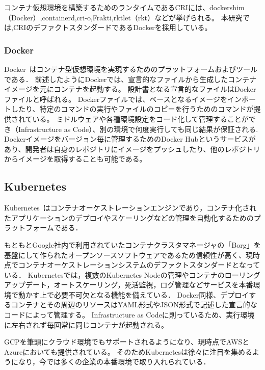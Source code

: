 コンテナ仮想環境を構築するためのランタイムであるCRIには、dockershim（Docker）,containerd,cri-o,Frakti,rktlet（rkt）などが挙げられる。
本研究では,CRIのデファクトスタンダードであるDockerを採用している。

\subsubsection{Docker}
\label{background:container-orchestration-system:container:docker}

Docker~\cite{Docker}はコンテナ型仮想環境を実現するためのプラットフォームおよびツールである．
前述したようにDockerでは、宣言的なファイルから生成したコンテナイメージを元にコンテナを起動する。
設計書となる宣言的なファイルはDockerファイルと呼ばれる。
Dockerファイルでは、ベースとなるイメージをインポートしたり、特定のコマンドの実行やファイルのコピーを行うためのコマンドが提供されている。
ミドルウェアや各種環境設定をコード化して管理することができ（Infrastructure as Code）、別の環境で何度実行しても同じ結果が保証される.
Dockerイメージをバージョン毎に管理するためのDocker Hubというサービスがあり、開発者は自身のレポジトリにイメージをプッシュしたり、他のレポジトリからイメージを取得することも可能である。

\subsection{Kubernetes}
\label{background:container-orchestration-system:kubernetes}

Kubernetes~\cite{Kubernetes}はコンテナオーケストレーションエンジンであり，コンテナ化されたアプリケーションのデプロイやスケーリングなどの管理を自動化するためのプラットフォームである．

もともとGoogle社内で利用されていたコンテナクラスタマネージャの「Borg」を基盤にして作られたオープンソースソフトウェアであるため信頼性が高く、現時点でコンテナオーケストレーションシステムのデファクトスタンダードとなっている．
Kubernetesでは，複数のKubernetes Nodeの管理やコンテナのローリングアップデート，オートスケーリング，死活監視，ログ管理などサービスを本番環境で動かす上で必要不可欠となる機能を備えている．
Docker同様、デプロイするコンテナとその周辺のリソースはYAML形式やJSON形式で記述した宣言的なコードによって管理する。
Infrastructure as Codeに則っているため、実行環境に左右されず毎回常に同じコンテナが起動される。

GCPを筆頭にクラウド環境でもサポートされるようになり、現時点でAWSとAzureにおいても提供されている。
そのためKubernetesは徐々に注目を集めるようになり，今では多くの企業の本番環境で取り入れられている．

